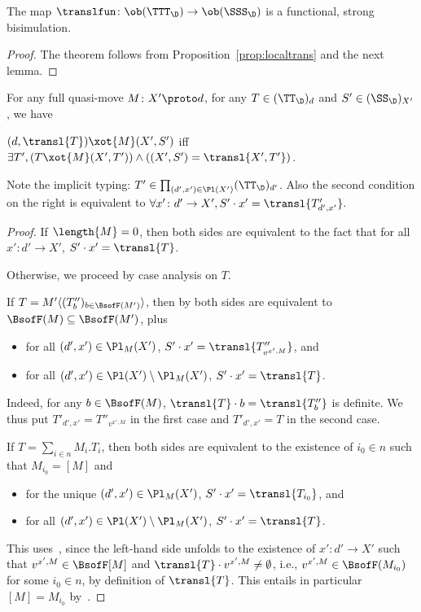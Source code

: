 \documentclass{LMCS}
\renewcommand{\with}[1]{\langle #1 \rangle}
\theoremstyle{plain}\newtheorem{satz}[thm]{Satz}
\begin{document}
\begin{thm}\label{thm:bisim}
  The map $\translfun \colon \ob(\TTT_\D) \to \ob(\SSS_\D)$ is a
  functional, strong bisimulation.
\end{thm}
\begin{proof}
  The theorem follows from Proposition~\ref{prop:localtrans} and the next lemma.
\end{proof}

\begin{lem}
  For any full quasi-move $M \colon X' \proto d$, for any $T \in
(\TT_\D)_d$ and $S' \in (\SS_\D)_{X'}$, we have
  \begin{center}
    $(d,\transl{T}) \xot{M} (X',S')$ \hfil iff \hfil
    $\exists T', (T \xot{M} (X',T')) \wedge ((X',S') = \transl{X',T'})$.
  \end{center}
\end{lem}
Note the implicit typing: $T' \in \prod_{(d',x') \in \Pl (X')} (\TT_\D)_{d'}$. Also
the second condition on the right is equivalent to $\forall x'
\colon d' \to X', S' \cdot {x'} = \transl{T'_{d',x'}}$.

\begin{proof}
  If $\length{M} = 0$, then both sides are equivalent to the fact that
  for all $x' \colon d' \to X'$, $S' \cdot {x'} = \transl{T}$.

  Otherwise, we proceed by case analysis on $T$. 

  If $T = M' \with{(T''_b)_{b \in \BsofF (M')}}$, then by  both sides are
  equivalent to $\BsofF(M) \subseteq \BsofF(M')$, plus
  \begin{itemize}
  \item for all $(d',x') \in \Pl_M (X')$, $S' \cdot {x'} = \transl{T''_{v^{x',M}}}$, and
  \item for all $(d',x') \in \Pl (X') \setminus \Pl_M (X')$, $S' \cdot {x'} = \transl{T}$.
  \end{itemize}
  Indeed, for any $b \in \BsofF (M)$, $\transl{T} \cdot b =
  \transl{T''_b}$ is definite.  We thus put $T'_{d',x'} =
  T''_{v^{x',M}}$ in the first case and $T'_{d',x'} = T$ in the second
  case.

  If $T = \sum_{i \in n} M_i.T_i$, then both sides are equivalent to 
  the existence of $i_0 \in n$ such that 
  $M_{i_0} = [M]$ and
  \begin{itemize}
  \item for the unique $(d',x') \in \Pl_M (X')$, $S' \cdot {x'} = \transl{T_{i_0}}$, and
  \item for all $(d',x') \in \Pl (X') \setminus \Pl_M (X')$, $S' \cdot {x'} = \transl{T}$.
  \end{itemize}
  This uses~, since the left-hand side unfolds to
  the existence of $x' \colon d' \to X'$ such that $v^{x',M} \in
  \BsofF [M]$ and $\transl{T} \cdot v^{x',M} \neq \emptyset$, i.e., $v^{x',M}
  \in \BsofF (M_{i_0})$ for some $i_0 \in n$, by definition of
  $\transl{T}$. This entails in particular $[M] = M_{i_0}$
  by~.
\end{proof}
\end{document}

